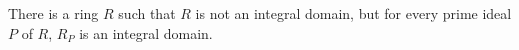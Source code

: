 There is a ring $R$ such that $R$ is not an integral domain, but for every
prime ideal $P$ of $R$, $R_P$ is an integral domain.
